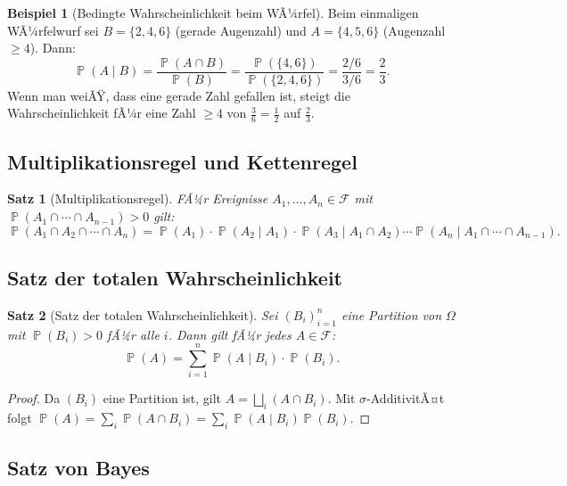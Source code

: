 ﻿\documentclass[12pt,a4paper]{article}
\theoremstyle{definition}
\newtheorem{beispiel}{Beispiel}[section]
\theoremstyle{plain}
\newtheorem{satz}{Satz}[section]
\theoremstyle{remark}
\DeclareMathOperator{\Prob}{\mathbb{P}}
\begin{document}
\begin{beispiel}[Bedingte Wahrscheinlichkeit beim WÃ¼rfel]\label{bsp:bedWuerfel}
  Beim einmaligen WÃ¼rfelwurf sei $B = \{2, 4, 6\}$ (gerade Augenzahl) und
  $A = \{4, 5, 6\}$ (Augenzahl $\geq 4$). Dann:
  \[
    \Prob(A \mid B) = \frac{\Prob(A \cap B)}{\Prob(B)}
    = \frac{\Prob(\{4,6\})}{\Prob(\{2,4,6\})}
    = \frac{2/6}{3/6} = \frac{2}{3}.
  \]
  Wenn man weiÃŸ, dass eine gerade Zahl gefallen ist, steigt die Wahrscheinlichkeit
  fÃ¼r eine Zahl $\geq 4$ von $\frac{3}{6} = \frac{1}{2}$ auf $\frac{2}{3}$.
\end{beispiel}

\subsection{Multiplikationsregel und Kettenregel}

\begin{satz}[Multiplikationsregel]\label{satz:multregel}
  FÃ¼r Ereignisse $A_1, \ldots, A_n \in \mathcal{F}$ mit
  $\Prob(A_1 \cap \cdots \cap A_{n-1}) > 0$ gilt:
  \[
    \Prob(A_1 \cap A_2 \cap \cdots \cap A_n)
    = \Prob(A_1) \cdot \Prob(A_2 \mid A_1)
      \cdot \Prob(A_3 \mid A_1 \cap A_2)
      \cdots \Prob(A_n \mid A_1 \cap \cdots \cap A_{n-1}).
  \]
\end{satz}

\subsection{Satz der totalen Wahrscheinlichkeit}

\begin{satz}[Satz der totalen Wahrscheinlichkeit]\label{satz:totalW}
  Sei $(B_i)_{i=1}^{n}$ eine Partition von $\Omega$ mit $\Prob(B_i) > 0$ fÃ¼r
  alle $i$. Dann gilt fÃ¼r jedes $A \in \mathcal{F}$:
  \[
    \Prob(A) = \sum_{i=1}^{n} \Prob(A \mid B_i) \cdot \Prob(B_i).
  \]
\end{satz}

\begin{proof}
  Da $(B_i)$ eine Partition ist, gilt $A = \bigsqcup_{i} (A \cap B_i)$.
  Mit $\sigma$-AdditivitÃ¤t folgt
  $\Prob(A) = \sum_i \Prob(A \cap B_i) = \sum_i \Prob(A \mid B_i)\Prob(B_i)$.
\end{proof}

\subsection{Satz von Bayes}
\end{document}
